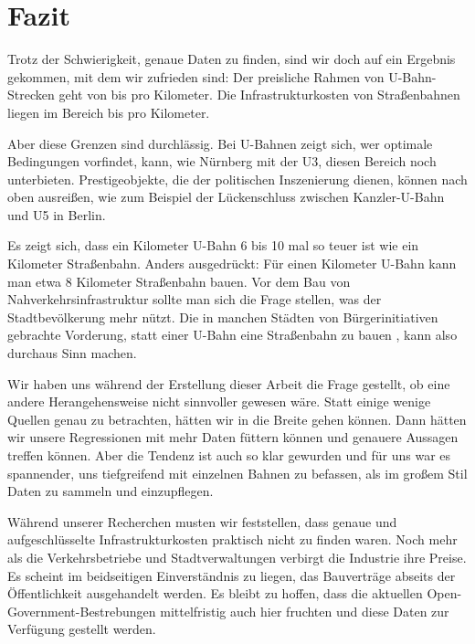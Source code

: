 \chapter{Fazit}




Trotz der Schwierigkeit, genaue Daten zu finden, sind wir doch auf ein Ergebnis gekommen, mit dem wir zufrieden sind: Der preisliche Rahmen von U-Bahn-Strecken geht von  bis  pro Kilometer. Die Infrastrukturkosten von Straßenbahnen liegen im Bereich  bis  pro Kilometer.

Aber diese Grenzen sind durchlässig. Bei U-Bahnen zeigt sich, wer optimale Bedingungen vorfindet, kann, wie Nürnberg mit der U3, diesen Bereich noch unterbieten. Prestigeobjekte, die der politischen Inszenierung dienen, können nach oben ausreißen, wie zum Beispiel der Lückenschluss zwischen Kanzler-U-Bahn und U5 in Berlin. 

Es zeigt sich, dass ein Kilometer U-Bahn 6 bis 10 mal so teuer ist wie ein Kilometer Straßenbahn. Anders ausgedrückt: Für einen Kilometer U-Bahn kann man etwa 8 Kilometer Straßenbahn bauen. Vor dem Bau von Nahverkehrsinfrastruktur sollte man sich die Frage stellen, was der Stadtbevölkerung mehr nützt. Die in manchen Städten von Bürgerinitiativen gebrachte Vorderung, statt einer U-Bahn eine Straßenbahn zu bauen \cite{fzNb}, kann also durchaus Sinn machen.

Wir haben uns während der Erstellung dieser Arbeit die Frage gestellt, ob eine andere Herangehensweise nicht sinnvoller gewesen wäre. Statt einige wenige Quellen genau zu betrachten, hätten wir in die Breite gehen können. Dann hätten wir unsere Regressionen mit mehr Daten füttern können und genauere Aussagen treffen können. Aber die Tendenz ist auch so klar gewurden und für uns war es spannender, uns tiefgreifend mit einzelnen Bahnen zu befassen, als im großem Stil Daten zu sammeln und einzupflegen.  

Während unserer Recherchen musten wir feststellen, dass genaue und aufgeschlüsselte Infrastrukturkosten praktisch nicht zu finden waren. Noch mehr als die Verkehrsbetriebe und Stadtverwaltungen verbirgt die Industrie ihre Preise. Es scheint im beidseitigen Einverständnis zu liegen, das Bauverträge abseits der Öffentlichkeit ausgehandelt werden. Es bleibt zu hoffen, dass die aktuellen Open-Government-Bestrebungen mittelfristig auch hier fruchten und diese Daten zur Verfügung gestellt werden. 
